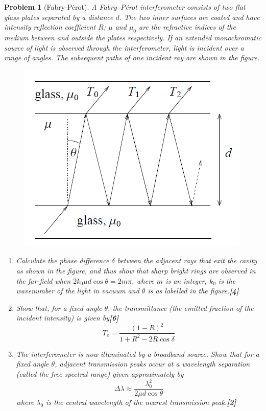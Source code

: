 \documentclass[a4paper]{article}
\theoremstyle{new}
\newtheorem{qns}{Problem}[subsection]
\begin{document}
\begin{qns}[Fabry-Pérot]
A Fabry–Pérot interferometer consists of two flat glass plates separated by a distance $d$. The two inner surfaces are coated and have intensity reflection coefficient $R$; $\mu$ and $\mu_0$ are the refractive indices of the medium between and outside the plates respectively.
If an extended monochromatic source of light is observed through the interferometer, light is incident over a range of angles. The subsequent paths of one incident ray are shown in the figure.
\begin{figure}[H]
    \centering
    \includegraphics[scale=0.5]{2012P2B7Q.PNG}
\end{figure}
\begin{enumerate}[label=(\roman*)]
\item Calculate the phase difference $\delta$ between the adjacent rays that exit the cavity as shown in the figure, and thus show that sharp bright rings are observed in the far-field when $2k_0\mu d\cos\theta=2m\pi$, where $m$ is an integer, $k_0$ is the wavenumber of the light in vacuum and $\theta$ is as labelled in the figure.\hfill\textbf{[4]}
\item Show that, for a fixed angle $\theta$, the transmittance (the emitted fraction of the incident intensity) is given by\hfill\textbf{[6]}
$$T_e=\frac{(1-R)^2}{1+R^2-2R\cos\delta}$$
\item The interferometer is now illuminated by a broadband source. Show that for a fixed angle $\theta$, adjacent transmission peaks occur at a wavelength separation (called the free spectral range) given approximately by
$$\Delta\lambda\approx\frac{\lambda_0^2}{2\mu d\cos\theta}$$
where $\lambda_0$ is the central wavelength of the nearest transmission peak.\hfill\textbf{[2]}\\[5pt]

\end{enumerate}
\end{qns}
\end{document}
